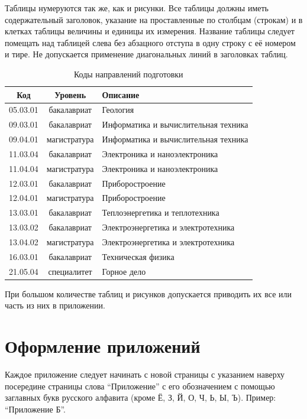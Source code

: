 \documentclass[utf8,14pt, coursreport]{G7-32}
\begin{document}
Таблицы нумеруются так же, как и рисунки. Все таблицы должны иметь содержательный заголовок, указание на проставленные по столбцам (строкам) и в клетках таблицы величины и единицы их измерения. Название таблицы следует помещать над таблицей слева без абзацного отступа в одну строку с её номером и тире. Не допускается применение диагональных линий в заголовках таблиц.

\begin{table}[h]
\caption{Коды направлений подготовки \cite{bachcodes, mastercodes}}
\begin{tabular}{|c|c|p{80mm}|}
\hline
Код & Уровень & Описание\\
\hline
05.03.01 & бакалавриат & Геология\\
09.03.01 & бакалавриат & Информатика и вычислительная техника\\
09.04.01 & магистратура & Информатика и вычислительная техника\\
11.03.04 & бакалавриат & Электроника и наноэлектроника\\
11.04.04 & магистратура & Электроника и наноэлектроника\\
12.03.01 & бакалавриат & Приборостроение\\
12.04.01 & магистратура & Приборостроение\\
13.03.01 & бакалавриат & Теплоэнергетика и теплотехника\\
13.03.02 & бакалавриат & Электроэнергетика и электротехника\\
13.04.02 & магистратура & Электроэнергетика и электротехника\\
16.03.01 & бакалавриат & Техническая физика\\
21.05.04 & специалитет & Горное дело\\
\hline
\end{tabular}
\end{table}

При большом количестве таблиц и рисунков допускается приводить их все или часть из них в приложении.

\section{Оформление приложений}

Каждое приложение следует начинать с новой страницы с указанием наверху посередине страницы слова ``Приложение'' с его обозначением с помощью заглавных букв русского алфавита (кроме Ё, З, Й, О, Ч, Ь, Ы, Ъ). Пример: ``Приложение Б''.
\end{document}
